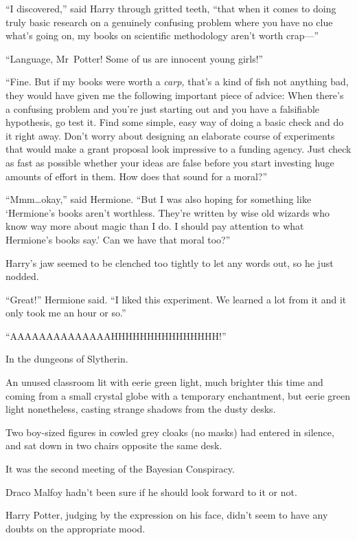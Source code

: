 “I discovered,” said Harry through gritted teeth, “that when it comes to doing truly basic research on a genuinely confusing problem where you have no clue what’s going on, my books on scientific methodology aren’t worth crap—”

“Language, Mr~Potter! Some of us are innocent young girls!”

“Fine. But if my books were worth a \emph{carp,} that’s a kind of fish not anything bad, they would have given me the following important piece of advice: When there’s a confusing problem and you’re just starting out and you have a falsifiable hypothesis, go test it. Find some simple, easy way of doing a basic check and do it right away. Don’t worry about designing an elaborate course of experiments that would make a grant proposal look impressive to a funding agency. Just check as fast as possible whether your ideas are false before you start investing huge amounts of effort in them. How does that sound for a moral?”

“Mmm…okay,” said Hermione. “But I was also hoping for something like ‘Hermione’s books aren’t worthless. They’re written by wise old wizards who know way more about magic than I do. I should pay attention to what Hermione’s books say.’ Can we have that moral too?”

Harry’s jaw seemed to be clenched too tightly to let any words out, so he just nodded.

“Great!” Hermione said. “I liked this experiment. We learned a lot from it and it only took me an hour or so.”

“AAAAAAAAAAAAAAHHHHHHHHHHHHHHH!”

\later

In the dungeons of Slytherin.

An unused classroom lit with eerie green light, much brighter this time and coming from a small crystal globe with a temporary enchantment, but eerie green light nonetheless, casting strange shadows from the dusty desks.

Two boy-sized figures in cowled grey cloaks (no masks) had entered in silence, and sat down in two chairs opposite the same desk.

It was the second meeting of the Bayesian Conspiracy.

Draco Malfoy hadn’t been sure if he should look forward to it or not.

Harry Potter, judging by the expression on his face, didn’t seem to have any doubts on the appropriate mood.

